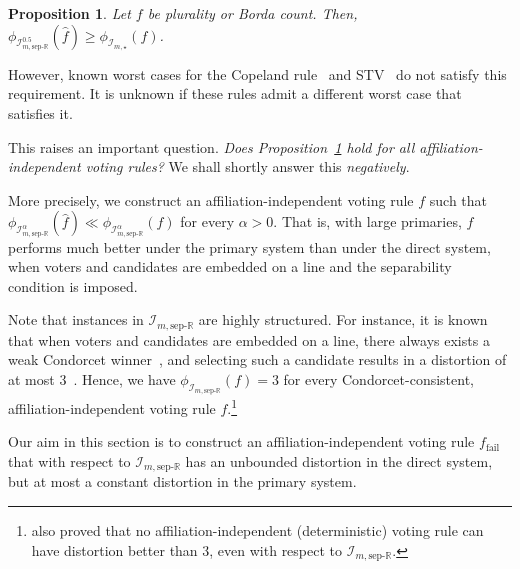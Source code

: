 \documentclass[letterpaper]{article} %
\newtheorem{proposition}[theorem]{Proposition}
\theoremstyle{definition}
\renewcommand{\hat}{\widehat}
\newcommand{\bbR}{\mathbb{R}}
\newcommand{\calI}{\mathcal{I}}
\newcommand{\all}{\star}
\newcommand{\sep}{\textrm{sep-}}
\newcommand{\eucline}{\bbR}
\newcommand{\euclinesep}{\sep\eucline}
\newcommand{\I}{\calI}
\newcommand{\fail}{{\textrm{fail}}}
\begin{document}
\begin{proposition}
	Let $f$ be plurality or Borda count. Then, $\phi_{\I^{0.5}_{m,\euclinesep}}(\hat{f}) \ge \phi_{\I_{m,\all}}(f)$.
\label{prop:plu-borda}
\end{proposition}


However, known worst cases for the Copeland rule~\cite{ABP15} and STV~\cite{SE17} do not satisfy this requirement. It is unknown if these rules admit a different worst case that satisfies it.

This raises an important question. \emph{Does Proposition~\ref{prop:plu-borda} hold for all affiliation-independent voting rules?} We shall shortly answer this \emph{negatively}.

More precisely, we construct an affiliation-independent voting rule $f$ such that $\phi_{\I^{\alpha}_{m,\euclinesep}}(\hat{f}) \ll \phi_{\I^{\alpha}_{m,\euclinesep}}(f)$ for every $\alpha > 0$. That is, with large primaries, $f$ performs much better under the primary system than under the direct system, when voters and candidates are embedded on a line and the separability condition is imposed.

Note that instances in $\I_{m,\euclinesep}$ are highly structured. For instance, it is known that when voters and candidates are embedded on a line, there always exists a weak Condorcet winner~\cite{Bla48}, and selecting such a candidate results in a distortion of at most $3$~\cite{ABP15}. Hence, we have $\phi_{\I_{m,\euclinesep}}(f) = 3$ for every Condorcet-consistent, affiliation-independent voting rule $f$.\footnote{\cite{ABP15} also proved that no affiliation-independent (deterministic) voting rule can have distortion better than $3$, even with respect to $\I_{m,\euclinesep}$.}

Our aim in this section is to construct an affiliation-independent voting rule $f_\fail$ that with respect to $\I_{m,\euclinesep}$ has an unbounded distortion in the direct system, but at most a constant distortion in the primary system.%
\end{document}
